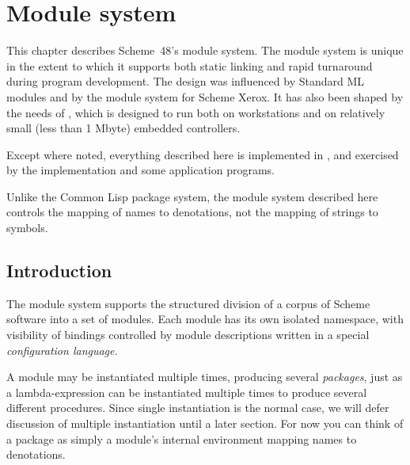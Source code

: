 
%
%
%
%

\chapter{Module system}
\label{chapter:modules}

This chapter describes Scheme~48's module system.
The module system is unique in the extent to which it
supports both static linking and rapid turnaround during program
development.  The design was influenced by Standard ML
modules\cite{MacQueen:Modules} and by the module system for Scheme
Xerox\cite{Curtis-Rauen:Modules}.  It has also been shaped by the
needs of \hack{}, which is designed to run both on workstations and
on relatively small (less than 1 Mbyte) embedded controllers.

Except where noted, everything described here is implemented in
\hack{}, and exercised by the \hack{} implementation and some
application programs.

Unlike the Common Lisp package system, the module system described
here controls the mapping of names to denotations, not the
mapping of strings to symbols.


\section{Introduction}

The module system supports the structured division of a corpus of
Scheme software into a set of modules.  Each module has its own
isolated namespace, with visibility of bindings controlled by module
descriptions written in a special {\em configuration language.}

A module may be instantiated multiple times, producing several {\em
packages}, just as a lambda-expression can be instantiated multiple
times to produce several different procedures.  Since single
instantiation is the normal case, we will defer discussion of multiple
instantiation until a later section.  For now you can think of a
package as simply a module's internal environment mapping names to
denotations.

